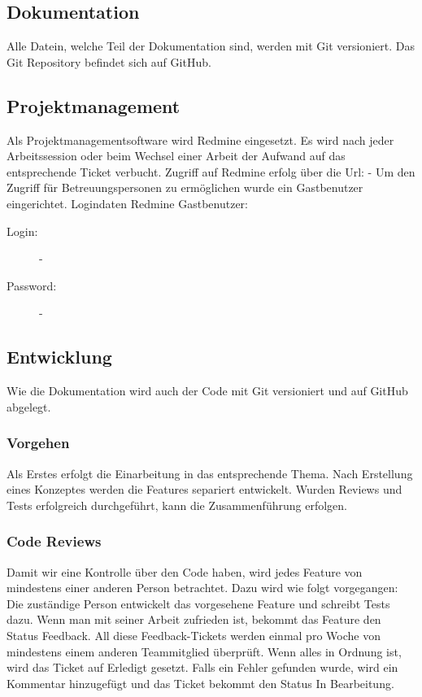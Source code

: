 \documentclass[a4,12pt]{scrartcl}
\begin{document}
\subsection{Dokumentation}
Alle Datein, welche Teil der Dokumentation sind, werden mit Git versioniert. Das Git Repository befindet sich auf GitHub.
\subsection{Projektmanagement}
Als Projektmanagementsoftware wird Redmine eingesetzt. 
Es wird nach jeder Arbeitssession oder beim Wechsel einer Arbeit der Aufwand auf das entsprechende Ticket verbucht.
Zugriff auf Redmine erfolg über die Url: - %
Um den Zugriff für Betreuungspersonen zu ermöglichen wurde ein Gastbenutzer eingerichtet.
\newline
\newline
Logindaten Redmine Gastbenutzer:
\begin{description}
\begin{description}
\item [Login:]
-
\item [Password:]
-
\end{description}
\end{description}


\subsection{Entwicklung}
Wie die Dokumentation wird auch der Code mit Git versioniert und auf GitHub abgelegt.

\subsubsection{Vorgehen}
Als Erstes erfolgt die Einarbeitung in das entsprechende Thema.
Nach Erstellung eines Konzeptes werden die Features separiert entwickelt.
Wurden Reviews und Tests erfolgreich durchgeführt, kann die Zusammenführung erfolgen.


\subsubsection{Code Reviews}
Damit wir eine Kontrolle über den Code haben, wird jedes Feature von mindestens einer anderen Person betrachtet.
Dazu wird wie folgt vorgegangen: \\
Die zuständige Person entwickelt das vorgesehene Feature und schreibt Tests dazu.
Wenn man mit seiner Arbeit zufrieden ist, bekommt das Feature den Status Feedback.
All diese Feedback-Tickets werden einmal pro Woche von mindestens einem anderen Teammitglied überprüft.
Wenn alles in Ordnung ist, wird das Ticket auf Erledigt gesetzt.
Falls ein Fehler gefunden wurde, wird ein Kommentar hinzugefügt und das Ticket bekommt den Status In Bearbeitung.
\end{document}
